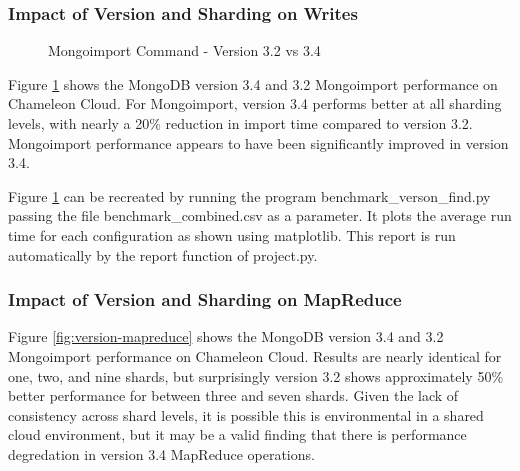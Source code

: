 \documentclass[9pt,twocolumn,twoside]{../../styles/osajnl}
\begin{document}
\subsubsection{Impact of Version and Sharding on Writes}

\begin{figure}[htbp]
\centering
{}
\caption{Mongoimport Command - Version 3.2 vs 3.4}
\label{fig:version-import}
\end{figure}

Figure \ref{fig:version-import} shows the MongoDB version 3.4 and 3.2 Mongoimport performance on Chameleon Cloud. For Mongoimport, version 3.4 performs better at all sharding levels, with nearly a 20\% reduction in import time compared to version 3.2.  Mongoimport performance appears to have been significantly improved in version 3.4.

Figure \ref{fig:version-import} can be recreated by running the program benchmark\_verson\_find.py passing the file benchmark\_combined.csv as a parameter.  It plots the average run time for each configuration as shown using matplotlib.  This report is run automatically by the report function of project.py.



\subsubsection{Impact of Version and Sharding on MapReduce}

Figure \ref{fig:version-mapreduce} shows the MongoDB version 3.4 and 3.2 Mongoimport performance on Chameleon Cloud.  Results are nearly identical for one, two, and nine shards, but surprisingly version 3.2 shows approximately 50\% better performance for between three and seven shards.  Given the lack of consistency across shard levels, it is possible this is environmental in a shared cloud environment, but it may be a valid finding that there is performance degredation in version 3.4 MapReduce operations.
\end{document}

